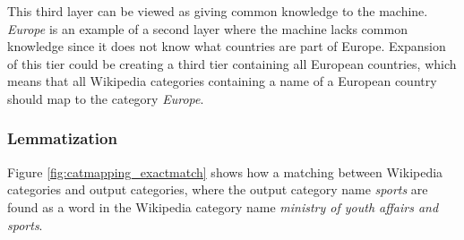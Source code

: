 


This third layer can be viewed as giving common knowledge to the machine. \emph{Europe} is an example of a second layer where the machine lacks common knowledge since it does not know what countries are part of Europe. Expansion of this tier could be creating a third tier containing all European countries, which means that all Wikipedia categories containing a name of a European country should map to the category \emph{Europe}.





\subsubsection{Lemmatization}

Figure \ref{fig:catmapping_exactmatch} shows how a matching between Wikipedia categories and output categories, where the output category name \emph{sports} are found as a word in the Wikipedia category name \emph{ministry of youth affairs and sports}.

